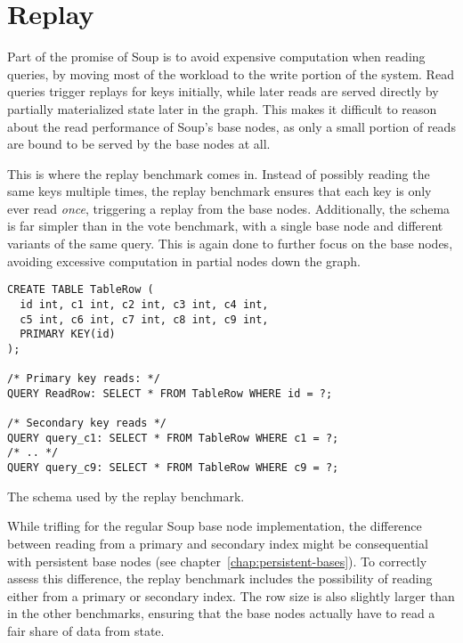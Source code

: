 \section{Replay}\label{sec:bench-replay}

Part of the promise of Soup is to avoid expensive computation when reading
queries, by moving most of the workload to the write portion of the system. Read
queries trigger replays for keys initially, while later reads are served
directly by partially materialized state later in the graph. This makes it
difficult to reason about the read performance of Soup's base nodes, as only a
small portion of reads are bound to be served by the base nodes at all.

This is where the replay benchmark comes in. Instead of possibly reading the
same keys multiple times, the replay benchmark ensures that each key is only
ever read \textit{once}, triggering a replay from the base nodes. Additionally,
the schema is far simpler than in the vote benchmark, with a single base node
and different variants of the same query. This is again done to further focus on
the base nodes, avoiding excessive computation in partial nodes down the graph.

\begin{listing}[H]
  \begin{verbatim}
CREATE TABLE TableRow (
  id int, c1 int, c2 int, c3 int, c4 int,
  c5 int, c6 int, c7 int, c8 int, c9 int,
  PRIMARY KEY(id)
);

/* Primary key reads: */
QUERY ReadRow: SELECT * FROM TableRow WHERE id = ?;

/* Secondary key reads */
QUERY query_c1: SELECT * FROM TableRow WHERE c1 = ?;
/* .. */
QUERY query_c9: SELECT * FROM TableRow WHERE c9 = ?;
  \end{verbatim}

  \caption{The schema used by the replay benchmark.}\label{lst:replay}
\end{listing}

While trifling for the regular Soup base node implementation, the difference
between reading from a primary and secondary index might be consequential with
persistent base nodes (see chapter~\ref{chap:persistent-bases}). To correctly
assess this difference, the replay benchmark includes the possibility of reading
either from a primary or secondary index. The row size is also slightly larger
than in the other benchmarks, ensuring that the base nodes actually have to read
a fair share of data from state.

